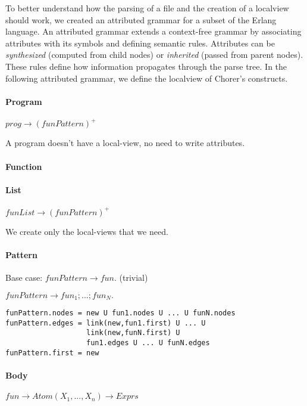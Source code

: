 To better understand how the parsing of a file and the creation of a localview 
should work, we created an attributed grammar for a subset of the Erlang language.
An attributed grammar extends a context-free grammar by associating attributes with 
its symbols and defining semantic rules. Attributes can be \textit{synthesized} (computed 
from child nodes) or \textit{inherited} (passed from parent nodes). These rules define how 
information propagates through the parse tree. In the following attributed grammar, 
we define the localview of Chorer's constructs.

\paragraph{Program}

$prog \to (funPattern)^+$

A program doesn't have a local-view, no need to write attributes.

\paragraph{Function 
}
\paragraph{List}

$funList \to (funPattern)^+$

We create only the local-views that we need.

\paragraph{Pattern}

Base case: $funPattern \to fun.$ (trivial)

$funPattern \to fun_1;...;fun_N.$

\begin{verbatim}
funPattern.nodes = new U fun1.nodes U ... U funN.nodes
funPattern.edges = link(new,fun1.first) U ... U 
                   link(new,funN.first) U 
                   fun1.edges U ... U funN.edges
funPattern.first = new
\end{verbatim}

\paragraph{Body}

$fun \to Atom(X_1,...,X_n) \to Exprs$

